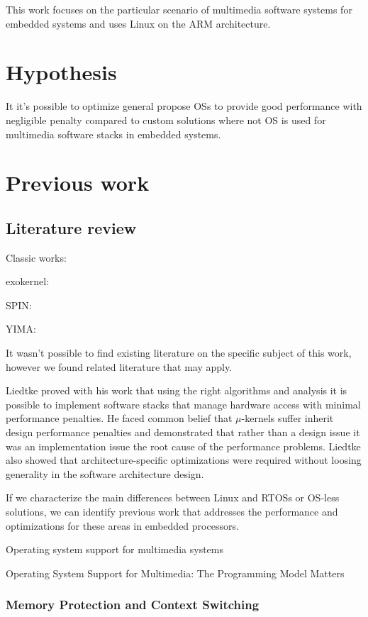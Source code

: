 This work focuses on the particular scenario of multimedia software systems for embedded systems and uses Linux on the ARM architecture.

\section{Hypothesis}
It it's possible to optimize general propose \aclp{OS} to provide good performance with negligible penalty compared to custom solutions where not \acl{OS} is used for multimedia software stacks in embedded systems.

\section{Previous work}
\subsection{Literature review}
Classic works:

exokernel: \cite{Engler95exokernel:an}

SPIN: \cite{Bershad95extensibility}

YIMA: \cite{Shahabi:2002vn}


It wasn't possible to find existing literature on the specific subject of this work, however we found related literature that may apply.

Liedtke \citep{Liedtke:1995kx} proved with his work that using the right algorithms and analysis it is possible to implement software stacks that manage hardware access with minimal performance penalties. He faced common belief that $\mu$-kernels suffer inherit design performance penalties and demonstrated that rather than a design issue it was an implementation issue the root cause of the performance problems. Liedtke also showed that architecture-specific optimizations were required without loosing generality in the software architecture design.

If we characterize the main differences between Linux and \acp{RTOS} or \ac{OS}-less solutions, we can identify previous work that addresses the performance and optimizations for these areas in embedded processors.

\cite{Plagemann2000267} Operating system support for multimedia systems

\cite{Regehr00operatingsystem} Operating System Support for Multimedia: The Programming Model Matters

\subsubsection{Memory Protection and Context Switching}

